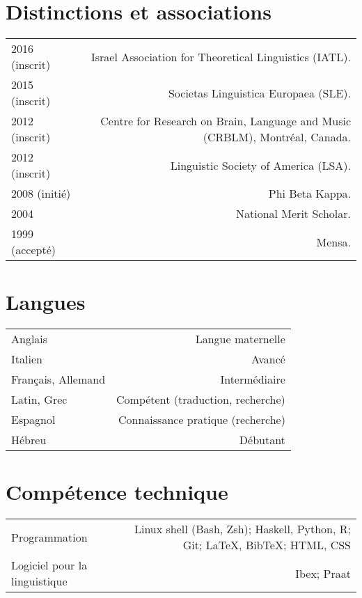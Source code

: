 \documentclass[11pt,a4paper,twoside,french]{article}
\makeatletter
\newenvironment{cvsection}{%
  \setlength{\extrarowheight}{0.70ex}
  \begin{longtable}[l]{@{} L R @{}}
}{%
  \end{longtable}
}
\makeatother
\begin{document}
\section*{Distinctions et associations}

\begin{cvsection}
  2016 {\footnotesize (inscrit)} & Israel Association for Theoretical Linguistics (IATL).\\
  2015 {\footnotesize (inscrit)} & Societas Linguistica Europaea (SLE).\\
  2012 {\footnotesize (inscrit)} & Centre for Research on Brain, Language and Music (CRBLM), Montr\'{e}al, Canada.\\
  2012 {\footnotesize (inscrit)} & Linguistic Society of America (LSA).\\
  2008 {\footnotesize (initié)} & Phi Beta Kappa.\\
  2004 & National Merit Scholar.\\
  1999 {\footnotesize (accepté)} & Mensa.\\
\end{cvsection}

\section*{Langues}

\begin{cvsection}
  Anglais & Langue maternelle\\
  Italien & Avancé\\
  Français, Allemand & Intermédiaire\\
  Latin, Grec & Compétent (traduction, recherche)\\
  Espagnol & Connaissance pratique (recherche)\\
  Hébreu & Débutant\\
\end{cvsection}

\section*{Compétence technique}

\begin{cvsection}
  Programmation & Linux shell (Bash, Zsh); Haskell, Python, R; Git; \LaTeX, Bib\TeX; HTML, CSS\\
  Logiciel pour la linguistique & Ibex; Praat\\
\end{cvsection}
\end{document}
